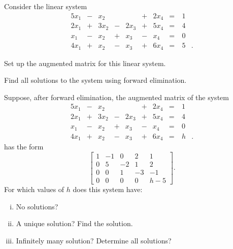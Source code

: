 \ExampleIntro

\begin{example} Consider the linear system 
\begin{alignat*}{5}
{}x_1		&{}-{} 	&{ }x_2		&{}{}		&{}		&{}+{}	&{2}x_4 	&{}= & \ 1&{} \\
{2}x_1	&{}+{} 	&{3}x_2		&{}-{}	&{2}x_3	&{}+{}	&{5}x_4 	&{}= & \ 4&{} \\
{}x_1		&{}-{} 	&{}x_2		&{}+{}	&{}x_3	&{}-{}	&{ }x_4 	&{}= & \ 0&{} \\
{4}x_1	&{}+{} 	&{}x_2		&{}-{}	&{}x_3	&{}+{}	&{6}x_4 	&{}= & \ 5&{.} 
\end{alignat*} 
	\ba
	\item Set up the augmented matrix for this linear system.
	
	\item Find all solutions to the system using forward elimination. 
	
	\item Suppose, after forward elimination, the augmented matrix of the system
\begin{alignat*}{5}
{}x_1		&{}-{} 	&{ }x_2		&{}{}		&{}		&{}+{}	&{2}x_4 	&{}= & \ 1&{} \\
{2}x_1	&{}+{} 	&{3}x_2		&{}-{}	&{2}x_3	&{}+{}	&{5}x_4 	&{}= & \ 4&{} \\
{}x_1		&{}-{} 	&{}x_2		&{}+{}	&{}x_3	&{}-{}	&{ }x_4 	&{}= & \ 0&{} \\
{4}x_1	&{}+{} 	&{}x_2		&{}-{}	&{}x_3	&{}+{}	&{6}x_4 	&{}= & \ h&{.} 
\end{alignat*} 
has the form
\[\left[ \begin{array}{crrr|c} 1&-1&0&2&1 \\ 0&5&-2&1&2 \\ 0&0&1&-3&-1 \\ 0&0&0&0&h-5 \end{array} \right].\]
For which values of $h$ does this system have: 
	\begin{enumerate}[i.]
	\item No solutions?
	\item A unique solution? Find the solution.
	\item Infinitely many solution? Determine all solutions? 
	\end{enumerate}
\ea


\end{example}
